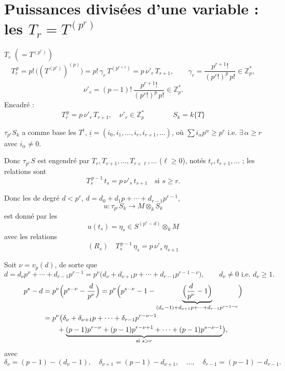 \documentclass[11pt,a4paper]{article}
\begin{document}
\section{Puissances divisées d'une variable : les $T_r = T^{(p^r)}$}



$T_r$ \quad $(= T^{(p^r)})$
\[
  T_r^{\,p} = p!\,\bigl((T^{(p^r)})^{(p)}\bigr) = p!\,\gamma_r\, T^{(p^{r+1})} = p\,\nu'_r\, T_{r+1},
  \qquad \gamma_r = \frac{p^{r+1}!}{(p^r!)^p\,p!} \in \mathbb{Z}_p^{*},
\]
\[
  \nu'_r = (p-1)!\,\frac{p^{r+1}!}{(p^r!)^p\,p!} \in \mathbb{Z}_p^{*} .
\]
Encadré :
\[
  \boxed{T_r^{\,p} = p\,\nu'_r\, T_{r+1}}, \quad \nu'_r \in \mathbb{Z}_p^{*}
  \qquad\qquad \boxed{S_k = k\{T\}}
\]

$\tau_{p^r} S_k$ a comme base les $T^{\underline{i}}$, $\underline{i} = (i_0, i_1, \ldots, i_r, i_{r+1}, \ldots)$,
où $\sum i_\alpha p^\alpha \geq p^r$ i.e. $\exists\, \alpha \geq r$ avec $i_\alpha \neq 0$.

Donc $\tau_{p^r} S$ est engendré par $T_r, T_{r+1}, \ldots, T_{r+\ell}, \ldots$ ($\ell \geq 0$),
notés $t_r, t_{r+1}, \ldots$ ; les relations sont
\[
  \boxed{T_s^{\,p-1}\, t_s = p\,\nu'_s\, t_{s+1} \quad \text{si } s \geq r .}
\]

Donc les  de degré $d < p^r$, $d = d_0 + d_1 p + \cdots + d_{r-1}p^{r-1}$,
\[
  u : \tau_{p^r} S_k \longrightarrow M \otimes_k S_k
\]
est donné par les
\[
  \boxed{u(t_s) = \eta_s \in S^{(p^s - d)} \otimes_k M}
\]
avec les relations
\[
  (R_s) \quad \boxed{T_s^{\,p-1}\,\eta_s = p\,\nu'_s\,\eta_{s+1}}
\]

Soit $\nu = v_p(d)$, de sorte que
\[
  d = d_\nu p^\nu + \cdots + d_{r-1}p^{r-1} = p^\nu\bigl(d_\nu + d_{\nu+1}p + \cdots + d_{r-1}p^{r-1-\nu}\bigr),
  \qquad d_\nu \neq 0 \text{ i.e. } d_\nu \geq 1 .
\]
\begin{align*}
  p^s - d &= p^\nu\Bigl(p^{s-\nu} - \frac{d}{p^\nu}\Bigr)
           = p^\nu\Bigl(p^{s-\nu} - 1 - \underbrace{\Bigl(\frac{d}{p^\nu} - 1\Bigr)}_{(d_\nu - 1) + d_{\nu+1}p + \cdots + d_{r-1}p^{r-1-\nu}}\Bigr) \\
          &= p^\nu\bigl(\delta_\nu + \delta_{\nu+1}p + \cdots + \delta_{r-1}p^{r-\nu-1} \\
          &\qquad + \underbrace{(p-1)p^{r-\nu} + (p-1)p^{r-\nu+1} + \cdots + (p-1)p^{s-\nu-1}}_{\text{si } s > r}\bigr),
\end{align*}
avec
\[
  \delta_\nu = (p-1) - (d_\nu - 1), \quad \delta_{\nu+1} = (p-1) - d_{\nu+1}, \quad \ldots, \quad \delta_{r-1} = (p-1) - d_{r-1} .
\]
\end{document}
